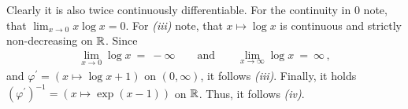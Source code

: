 \begin{example}
Clearly it is also twice continuously differentiable.
For the continuity in $0$ note, that $\lim_{x\to 0} x\log x=0$. 
For \textit{(iii)} note, that $x\mapsto \log x$ is continuous and strictly non-decreasing on $\mathbb{R}$. 
Since 
\begin{align*}
  \lim_{x\to 0}\log x\ =\ -\infty
  \qquad
  \text{and}
  \qquad
  \lim_{x\to \infty}\log x\ =\ \infty
  \,,
\end{align*}
and $\varphi^{'}=(x\mapsto \log x +1)$ on $(0,\infty)$, it follows \textit{(iii)}. 
Finally, it holds $(\varphi^{'})^{-1}=(x\mapsto \exp(x-1))$ on $\mathbb{R}$. 
Thus, it follows \textit{(iv)}.
\end{example}
